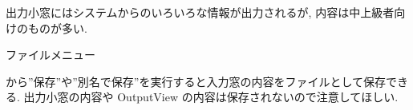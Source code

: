 \documentclass{jbook}
\begin{document}
出力小窓にはシステムからのいろいろな情報が出力されるが,
内容は中上級者向けのものが多い.

ファイルメニュー
\begin{center}
\end{center}
から''保存''や''別名で保存''を実行すると入力窓の内容をファイルとして保存できる.
出力小窓の内容や OutputView の内容は保存されないので注意してほしい.
\end{document}
